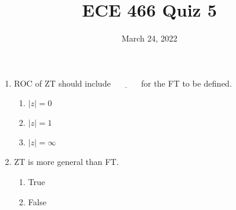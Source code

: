 \documentclass{article}
\date{March 24, 2022}
\begin{document}
 
\title{ECE 466 Quiz 5}
 
\maketitle
 
\begin{enumerate}

    \item ROC of ZT should include $\underline{\hspace{3em}}$ for the FT to be
    defined.
    \begin{enumerate}
        \item $|z|=0$
        \item $|z|=1$
        \item $|z|=\infty$
    \end{enumerate}

    \item ZT is more general than FT.
    \begin{enumerate}
        \item True
        \item False
    \end{enumerate}

\end{enumerate}
\end{document}
